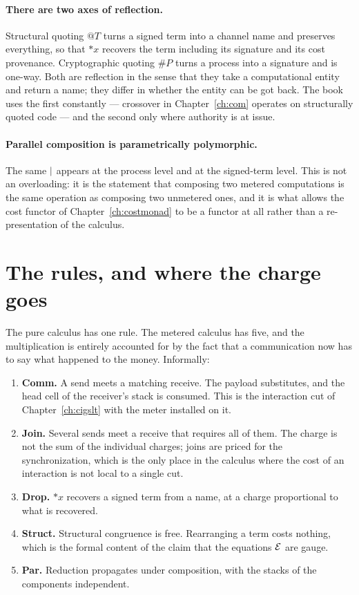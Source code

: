 \paragraph{There are two axes of reflection.}
Structural quoting $@T$ turns a signed term into a channel name and
preserves everything, so that ${*}x$ recovers the term including its
signature and its cost provenance.
Cryptographic quoting $\#P$ turns a process into a signature and is
one-way.
Both are reflection in the sense that they take a computational entity and
return a name; they differ in whether the entity can be got back.
The book uses the first constantly --- crossover in
Chapter~\ref{ch:com} operates on structurally quoted code --- and the
second only where authority is at issue.

\paragraph{Parallel composition is parametrically polymorphic.}
The same $\mid$ appears at the process level and at the signed-term
level.
This is not an overloading: it is the statement that composing two
metered computations is the same operation as composing two unmetered
ones, and it is what allows the cost functor of
Chapter~\ref{ch:costmonad} to be a functor at all rather than a
re-presentation of the calculus.

\section{The rules, and where the charge goes}

The pure calculus has one rule.
The metered calculus has five, and the multiplication is entirely
accounted for by the fact that a communication now has to say what
happened to the money.
Informally:

\begin{enumerate}[itemsep=3pt]
  \item \textbf{Comm.}
    A send meets a matching receive.
    The payload substitutes, and the head cell of the receiver's stack is
    consumed.
    This is the interaction cut of Chapter~\ref{ch:cigslt} with the meter
    installed on it.
  \item \textbf{Join.}
    Several sends meet a receive that requires all of them.
    The charge is not the sum of the individual charges; joins are priced
    for the synchronization, which is the only place in the calculus
    where the cost of an interaction is not local to a single cut.
  \item \textbf{Drop.}
    ${*}x$ recovers a signed term from a name, at a charge proportional to
    what is recovered.
  \item \textbf{Struct.}
    Structural congruence is free.
    Rearranging a term costs nothing, which is the formal content of the
    claim that the equations $\mathcal{E}$ are gauge.
  \item \textbf{Par.}
    Reduction propagates under composition, with the stacks of the
    components independent.
\end{enumerate}

